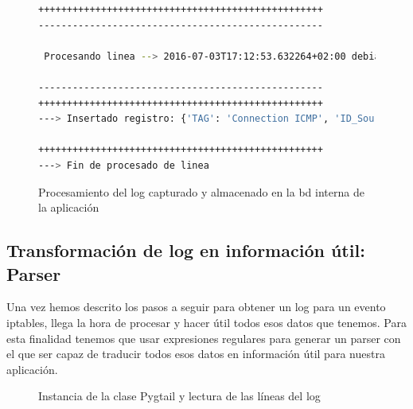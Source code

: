 \begin{figure}[H]
\begin{lstlisting}[language=bash, breaklines=true]
++++++++++++++++++++++++++++++++++++++++++++++++++
--------------------------------------------------

 Procesando linea --> 2016-07-03T17:12:53.632264+02:00 debian kernel: [23896.003739] IPTMSG=Connection ICMP IN=lo OUT= MAC=00:00:00:00:00:00:00:00:00:00:00:00:08:00 SRC=127.0.0.1 DST=127.0.0.1 LEN=84 TOS=0x00 PREC=0x00 TTL=64 ID=64157 DF PROTO=ICMP TYPE=8 CODE=0 ID=14177 SEQ=7

--------------------------------------------------
++++++++++++++++++++++++++++++++++++++++++++++++++
---> Insertado registro: {'TAG': 'Connection ICMP', 'ID_Source_PORT': None, 'Protocol': u'ICMP', 'RAW_Info': '2016-07-03T17:12:53.632264+02:00 debian kernel 23896.003739 IPTMSG=Connection ICMP IN=lo OUT MAC=00:00:00:00:00:00:00:00:00:00:00:00:08:00 SRC=127.0.0.1 DST=127.0.0.1 LEN=84 TOS=0x00 PREC=0x00 TTL=64 ID=64157 DF PROTO=ICMP TYPE=8 CODE=0 ID=14177 SEQ=7 ', 'ID_Source_MAC': <Macs: 00:00:00:00:00:00:00:00:00:00:00:00:08:00>, 'ID_Source_IP': <Ips: 127.0.0.1>, 'ID_Dest_IP': <Ips: 127.0.0.1>, 'ID_Dest_PORT': None, 'ID_Dest_MAC': <Macs: 00:00:00:00:00:00:00:00:00:00:00:00:08:00>}

++++++++++++++++++++++++++++++++++++++++++++++++++
---> Fin de procesado de linea
\end{lstlisting}
\caption{Procesamiento del log capturado y almacenado en la bd interna de la aplicación}
\end{figure}

\subsection[Parser]{Transformación de log en información útil: Parser}

Una vez hemos descrito los pasos a seguir para obtener un log para un evento iptables, llega la hora de procesar y hacer útil todos esos datos que tenemos. Para esta finalidad tenemos que usar expresiones regulares para generar un parser con el que ser capaz de traducir todos esos datos en información útil para nuestra aplicación.\\

\begin{figure}[H]

\caption{Instancia de la clase Pygtail y lectura de las líneas del log}
\end{figure}

